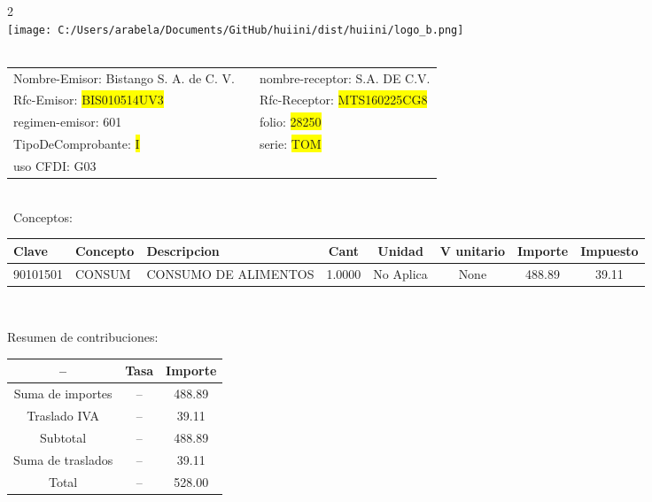 \documentclass{article}
\begin{document}
\hspace{18cm} 2\\
\texttt{[image: C:/Users/arabela/Documents/GitHub/huiini/dist/huiini/logo\_b.png]}
\bigskip\\\
\begin{tabular}{p{11cm}p{1cm}p{8cm}}

Nombre-Emisor: Bistango S. A. de C. V. && nombre-receptor: S.A. DE C.V.\\

Rfc-Emisor: \colorbox{yellow}{ BIS010514UV3 } & & Rfc-Receptor: \colorbox{yellow}{ MTS160225CG8 }\\

regimen-emisor: 601 & & folio: \colorbox{yellow}{ 28250 }\\

TipoDeComprobante: \colorbox{yellow}{ I } & & serie: \colorbox{yellow}{ TOM }\\

uso CFDI: G03\\



\end{tabular}
\bigskip\bigskip\bigskip\\\
Conceptos:\\
\begin{tabular}{|p{1.5cm}|p{3.6cm}|p{3.6cm}|c|c|c|c|c|}
\hline
Clave & Concepto & Descripcion & Cant & Unidad & V unitario & Importe & Impuesto \\
\hline

90101501 & CONSUM & CONSUMO DE ALIMENTOS & 1.0000 & No Aplica & None & 488.89 &  39.11 \\
\hline

\end{tabular}\\
\bigskip
\begin{center}
Resumen de contribuciones:\\
\bigskip
\begin{tabular}{|c|c|c|}
\hline
 -- & Tasa & Importe\\
\hline

Suma de importes & -- & 488.89 \\
\hline

Traslado IVA & -- & 39.11 \\
\hline

Subtotal  & -- & 488.89 \\
\hline

Suma de traslados & -- & 39.11 \\
\hline

Total  & -- & 528.00 \\
\hline

\end{tabular}
\end{center}
\end{document}
